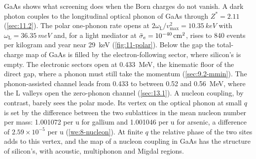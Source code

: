GaAs shows what screening does when the Born charges do not vanish. A dark photon couples to the longitudinal optical phonon of GaAs through $Z^* = 2.11$ (\cref{sec:11.2}). The polar one-phonon rate opens at $2\omega_{\mathrm{L}}/v_{\mathrm{max}}^2 = \SI{10.35}{keV}$ with $\omega_{\mathrm{L}} = \SI{36.35}{meV}$ and, for a light mediator at $\bar{\sigma}_{e} = \SI{e-40}{cm^2}$, rises to 840 events per kilogram and year near \SI{29}{keV} (\cref{fig:11-polar}). Below the gap the total-charge map of GaAs is filled by the electron-following sector, where silicon's is empty. The electronic sectors open at \SI{0.433}{MeV}, the kinematic floor of the direct gap, where a phonon must still take the momentum (\cref{sec:9.2-mmin}). The phonon-assisted channel leads from 0.433 to between 0.52 and \SI{0.56}{MeV}, where the L valleys open the zero-phonon channel (\cref{sec:13.1}). A nucleon coupling, by contrast, barely sees the polar mode. Its vertex on the optical phonon at small $q$ is set by the difference between the two sublattices in the mean nucleon number per mass: 1.001072 per u for gallium and 1.001046 per u for arsenic, a difference of $2.59\times10^{-5}$ per u (\cref{we:8-nucleon}). At finite $q$ the relative phase of the two sites adds to this vertex, and the map of a nucleon coupling in GaAs has the structure of silicon's, with acoustic, multiphonon and Migdal regions.

